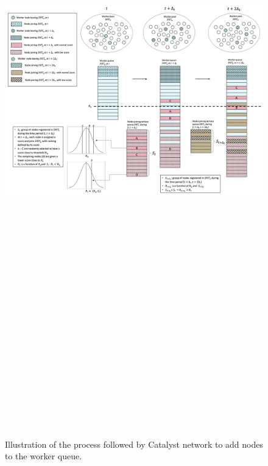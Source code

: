 \newpage
\begin{landscape}
\begin{figure}
\centering
\includegraphics[width=22cm,height=42cm,keepaspectratio]{Figures/Work_Queue_Management}
\caption{\label{fig:NSM}Illustration of the process followed by Catalyst network to add nodes to the worker queue.}
\end{figure}
\end{landscape}

